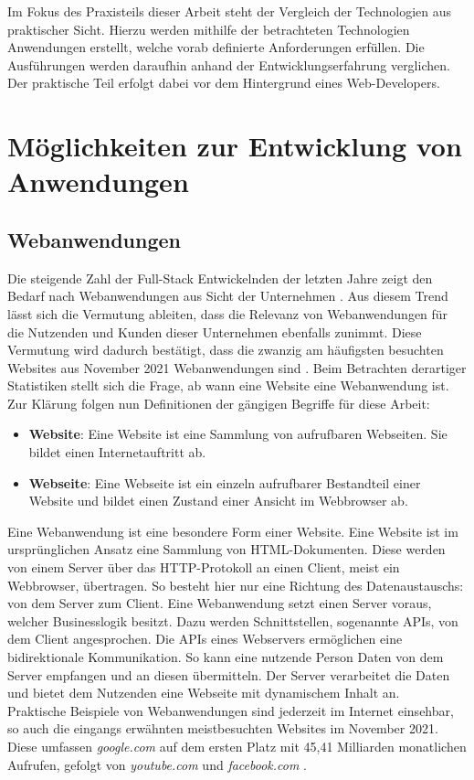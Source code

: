 \documentclass[a4paper]{scrartcl}
\begin{document}
 Im Fokus des Praxisteils dieser Arbeit steht der Vergleich der Technologien aus praktischer Sicht. Hierzu werden mithilfe der betrachteten Technologien Anwendungen erstellt, welche vorab definierte Anforderungen erfüllen. Die Ausführungen werden daraufhin anhand der Entwicklungserfahrung verglichen. Der praktische Teil erfolgt dabei vor dem Hintergrund eines Web-Developers. 

\section{Möglichkeiten zur Entwicklung von Anwendungen}

\subsection{Webanwendungen}

Die steigende Zahl der Full-Stack Entwickelnden der letzten Jahre zeigt den Bedarf nach Webanwendungen aus Sicht der Unternehmen \autocite{stackoverflow_2020}. Aus diesem Trend lässt sich die Vermutung ableiten, dass die Relevanz von Webanwendungen für die Nutzenden und Kunden dieser Unternehmen ebenfalls zunimmt. Diese Vermutung wird dadurch bestätigt, dass die zwanzig am häufigsten besuchten Websites aus November 2021 Webanwendungen sind \autocite{Clement}. Beim Betrachten derartiger Statistiken stellt sich die Frage, ab wann eine Website eine Webanwendung ist. Zur Klärung folgen nun Definitionen der gängigen Begriffe für diese Arbeit: 

\begin{itemize}
	\item[] \textbf{Website}: Eine Website ist eine Sammlung von aufrufbaren Webseiten. Sie bildet einen Internetauftritt ab.
	\item[] \textbf{Webseite}: Eine Webseite ist ein einzeln aufrufbarer Bestandteil einer Website und bildet einen Zustand einer Ansicht im Webbrowser ab.
\end{itemize}

Eine Webanwendung ist eine besondere Form einer Website. Eine Website ist im ursprünglichen Ansatz eine Sammlung von HTML-Dokumenten. Diese werden von einem Server über das HTTP-Protokoll an einen Client, meist ein Webbrowser, übertragen. So besteht hier nur eine Richtung des Datenaustauschs: von dem Server zum Client. Eine Webanwendung setzt einen Server voraus, welcher Businesslogik besitzt. Dazu werden Schnittstellen, sogenannte APIs, von dem Client angesprochen. Die APIs eines Webservers ermöglichen eine bidirektionale Kommunikation. So kann eine nutzende Person Daten von dem Server empfangen und an diesen übermitteln. Der Server verarbeitet die Daten und bietet dem Nutzenden eine Webseite mit dynamischem Inhalt an. \\
Praktische Beispiele von Webanwendungen sind jederzeit im Internet einsehbar, so auch die eingangs erwähnten meistbesuchten Websites im November 2021. Diese umfassen \textit{google.com} auf dem ersten Platz mit 45,41 Milliarden monatlichen Aufrufen, gefolgt von \textit{youtube.com} und \textit{facebook.com} \autocite{Clement}. \\
\end{document}
